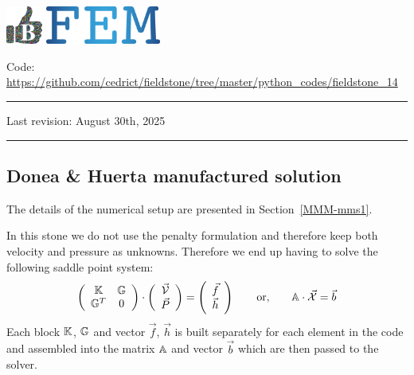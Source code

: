 \includegraphics[height=1.25cm]{images/pictograms/benchmark}
\includegraphics[height=1.25cm]{images/pictograms/FEM}


%

\begin{center}
\inpython
{\small Code: \url{https://github.com/cedrict/fieldstone/tree/master/python_codes/fieldstone_14}}
\end{center}

\par\noindent\rule{\textwidth}{0.4pt}

Last revision: August 30th, 2025

\par\noindent\rule{\textwidth}{0.4pt}

\subsection*{Donea \& Huerta manufactured solution}

The details of the numerical setup are presented in Section~\ref{MMM-mms1}.

In this stone we do not use the penalty formulation and therefore 
keep both velocity and pressure as unknowns. Therefore we end up having to solve 
the following saddle point system:
\[
\left(
\begin{array}{cc}
{\mathbb{K}} & {\mathbb{G}} \\ {\mathbb{G}}^T & 0 
\end{array}
\right)
\cdot
\left(
\begin{array}{c}
\vec{\cal V} \\ \vec{P}
\end{array}
\right)
=
\left(
\begin{array}{c}
\vec{f} \\ \vec{h}
\end{array}
\right)
\quad\quad
{\rm or,}
\quad\quad
{\mathbb{A}} \cdot \vec{\cal X} =\vec{b}
\]
Each block ${\mathbb{K}}$, ${\mathbb{G}}$ and vector $\vec{f}$, $\vec{h}$ is built separately for each element 
in the code and assembled into 
the matrix ${\mathbb{A}}$ and vector $\vec{b}$ which are then passed to the solver. 


